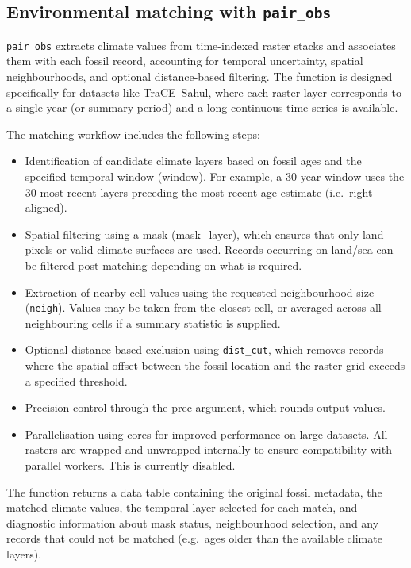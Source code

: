 \documentclass[
]{article}
\begin{document}
\subsection{\texorpdfstring{Environmental matching with
\texttt{pair\_obs}}{Environmental matching with pair\_obs}}\label{environmental-matching-with-pair_obs}

\texttt{pair\_obs} extracts climate values from time-indexed raster
stacks and associates them with each fossil record, accounting for
temporal uncertainty, spatial neighbourhoods, and optional
distance-based filtering. The function is designed specifically for
datasets like TraCE--Sahul, where each raster layer corresponds to a
single year (or summary period) and a long continuous time series is
available.

The matching workflow includes the following steps:

\begin{itemize}
\item
  Identification of candidate climate layers based on fossil ages and
  the specified temporal window (window). For example, a 30-year window
  uses the 30 most recent layers preceding the most-recent age estimate
  (i.e.~right aligned).
\item
  Spatial filtering using a mask (mask\_layer), which ensures that only
  land pixels or valid climate surfaces are used. Records occurring on
  land/sea can be filtered post-matching depending on what is required.
\item
  Extraction of nearby cell values using the requested neighbourhood
  size (\texttt{neigh}). Values may be taken from the closest cell, or
  averaged across all neighbouring cells if a summary statistic is
  supplied.
\item
  Optional distance-based exclusion using \texttt{dist\_cut}, which
  removes records where the spatial offset between the fossil location
  and the raster grid exceeds a specified threshold.
\item
  Precision control through the prec argument, which rounds output
  values.
\item
  Parallelisation using cores for improved performance on large
  datasets. All rasters are wrapped and unwrapped internally to ensure
  compatibility with parallel workers. This is currently disabled.
\end{itemize}

The function returns a data table containing the original fossil
metadata, the matched climate values, the temporal layer selected for
each match, and diagnostic information about mask status, neighbourhood
selection, and any records that could not be matched (e.g.~ages older
than the available climate layers).
\end{document}
